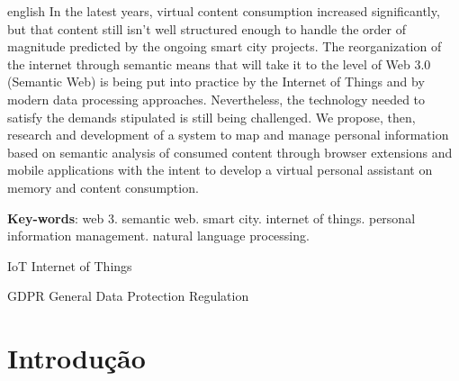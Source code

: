 \documentclass[
	12pt,				%
	openright,			%
	twoside,			%
	a4paper,			%
	english,			%
	french,				%
	spanish,			%
	brazil				%
	]{abntex2}
\begin{document}
\begin{resumo}[Abstract]
 \begin{otherlanguage*}{english}
   In the latest years, virtual content consumption increased significantly, but that content still isn't well structured enough to handle the order of magnitude predicted by the ongoing smart city projects. The reorganization of the internet through semantic means that will take it to the level of Web 3.0 (Semantic Web) is being put into practice by the Internet of Things and by modern data processing approaches. Nevertheless, the technology needed to satisfy the demands stipulated is still being challenged. We propose, then, research and development of a system to map and manage personal information based on semantic analysis of consumed content through browser extensions and mobile applications with the intent to develop a virtual personal assistant on memory and content consumption.

   \vspace{\onelineskip}
 
   \noindent 
   \textbf{Key-words}: web 3. semantic web. smart city. internet of things. personal information management. natural language processing.
 \end{otherlanguage*}
\end{resumo}

\listoffigures*
\cleardoublepage

\begin{siglas}
  \item[IoT] Internet of Things
  \item[GDPR] General Data Protection Regulation
\end{siglas}

\tableofcontents*
\cleardoublepage



\textual

\part{Introdução}
\end{document}
